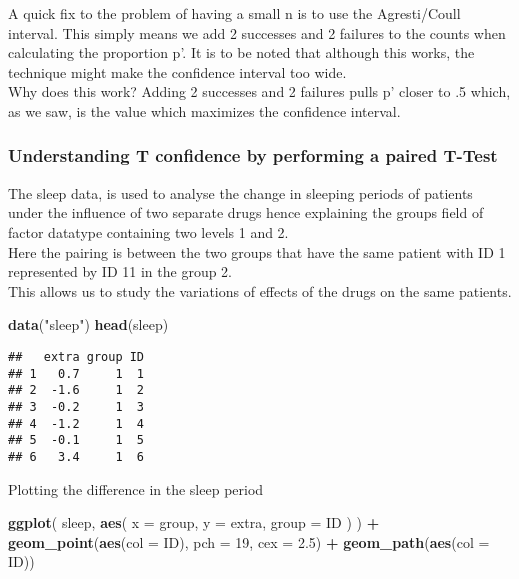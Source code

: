\documentclass[
]{article}
\newenvironment{Shaded}{\begin{snugshade}}{\end{snugshade}}
\newcommand{\DataTypeTok}[1]{\textcolor[rgb]{0.13,0.29,0.53}{#1}}
\newcommand{\DecValTok}[1]{\textcolor[rgb]{0.00,0.00,0.81}{#1}}
\newcommand{\FloatTok}[1]{\textcolor[rgb]{0.00,0.00,0.81}{#1}}
\newcommand{\KeywordTok}[1]{\textcolor[rgb]{0.13,0.29,0.53}{\textbf{#1}}}
\newcommand{\NormalTok}[1]{#1}
\newcommand{\OperatorTok}[1]{\textcolor[rgb]{0.81,0.36,0.00}{\textbf{#1}}}
\newcommand{\StringTok}[1]{\textcolor[rgb]{0.31,0.60,0.02}{#1}}
\begin{document}
A quick fix to the problem of having a small n is to use the
Agresti/Coull interval. This simply means we add 2 successes and 2
failures to the counts when calculating the proportion p'. It is to be
noted that although this works, the technique might make the confidence
interval too wide.\\
Why does this work? Adding 2 successes and 2 failures pulls p' closer to
.5 which, as we saw, is the value which maximizes the confidence
interval.

\hypertarget{understanding-t-confidence-by-performing-a-paired-t-test}{%
\subsubsection{Understanding T confidence by performing a paired
T-Test}\label{understanding-t-confidence-by-performing-a-paired-t-test}}

The sleep data, is used to analyse the change in sleeping periods of
patients under the influence of two separate drugs hence explaining the
groups field of factor datatype containing two levels 1 and 2.\\
Here the pairing is between the two groups that have the same patient
with ID 1 represented by ID 11 in the group 2.\\
This allows us to study the variations of effects of the drugs on the
same patients.

\begin{Shaded}
\begin{Highlighting}[]
\KeywordTok{data}\NormalTok{(}\StringTok{"sleep"}\NormalTok{)}
\KeywordTok{head}\NormalTok{(sleep)}
\end{Highlighting}
\end{Shaded}

\begin{verbatim}
##   extra group ID
## 1   0.7     1  1
## 2  -1.6     1  2
## 3  -0.2     1  3
## 4  -1.2     1  4
## 5  -0.1     1  5
## 6   3.4     1  6
\end{verbatim}

Plotting the difference in the sleep period

\begin{Shaded}
\begin{Highlighting}[]
\KeywordTok{ggplot}\NormalTok{(}
\NormalTok{  sleep,}
  \KeywordTok{aes}\NormalTok{(}
    \DataTypeTok{x =}\NormalTok{ group,}
    \DataTypeTok{y =}\NormalTok{ extra,}
    \DataTypeTok{group =}\NormalTok{ ID}
\NormalTok{  )}
\NormalTok{) }\OperatorTok{+}\StringTok{ }\KeywordTok{geom_point}\NormalTok{(}\KeywordTok{aes}\NormalTok{(}\DataTypeTok{col =}\NormalTok{ ID), }\DataTypeTok{pch =} \DecValTok{19}\NormalTok{, }\DataTypeTok{cex =} \FloatTok{2.5}\NormalTok{) }\OperatorTok{+}\StringTok{ }\KeywordTok{geom_path}\NormalTok{(}\KeywordTok{aes}\NormalTok{(}\DataTypeTok{col =}\NormalTok{ ID))}
\end{Highlighting}
\end{Shaded}
\end{document}
